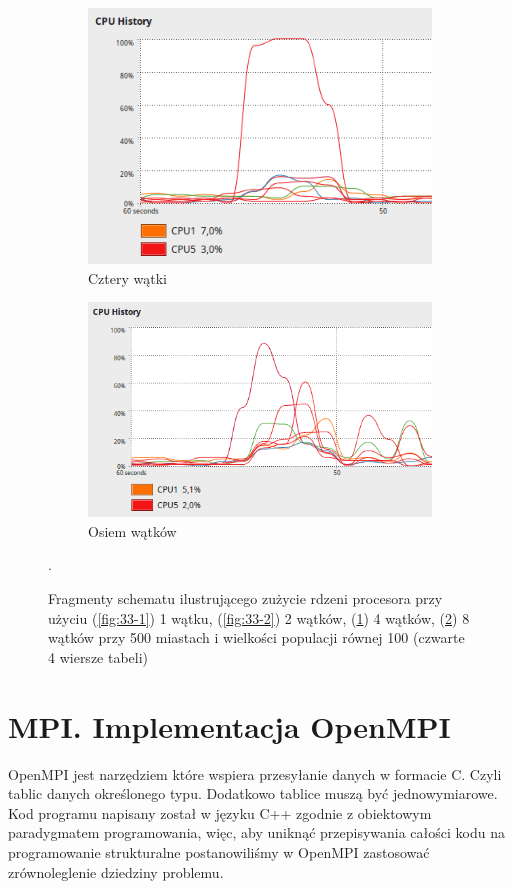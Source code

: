 \documentclass[10pt,a4paper]{article}
\begin{document}
\begin{figure}[H]
    \begin{subfigure}[b]{0.4\textwidth}
        \includegraphics[width=\textwidth]{33-4.png}
        \caption{Cztery wątki}
        \label{fig:33-4}
    \end{subfigure} 
    \begin{subfigure}[b]{0.4\textwidth}
            \includegraphics[width=\textwidth]{33-8.png}
            \caption{Osiem wątków}
            \label{fig:33-8}
    \end{subfigure}
    \caption{Fragmenty schematu ilustrującego zużycie rdzeni procesora przy użyciu (\ref{fig:33-1}) 1 wątku, (\ref{fig:33-2}) 2 wątków, (\ref{fig:33-4}) 4 wątków, (\ref{fig:33-8}) 8 wątków przy 500 miastach i wielkości populacji równej 100 (czwarte 4 wiersze tabeli)}\label{fig:33}. 
\end{figure}
\section{MPI. Implementacja OpenMPI}
 OpenMPI jest narzędziem które wspiera przesyłanie danych w formacie C. Czyli tablic danych określonego typu. Dodatkowo tablice muszą być jednowymiarowe. Kod programu napisany został w języku C++ zgodnie z obiektowym paradygmatem programowania, więc, aby uniknąć przepisywania całości kodu na programowanie strukturalne postanowiliśmy w OpenMPI zastosować zrównoleglenie dziedziny problemu. 
\end{document}
